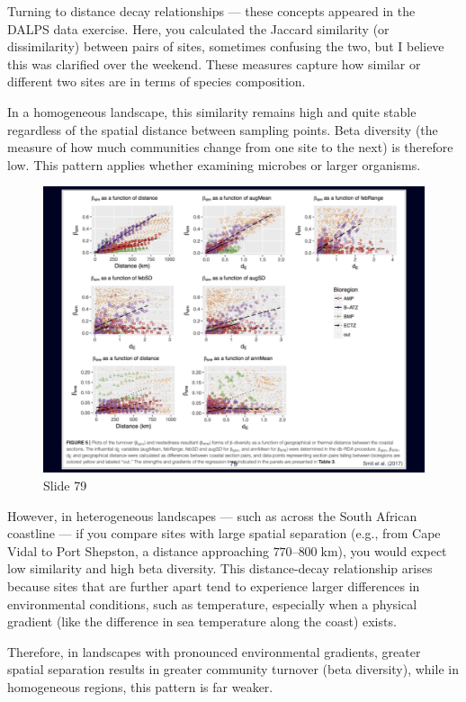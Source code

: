 \documentclass[
  10pt,
]{book}
\begin{document}
Turning to distance decay relationships --- these concepts appeared in
the DALPS data exercise. Here, you calculated the Jaccard similarity (or
dissimilarity) between pairs of sites, sometimes confusing the two, but
I believe this was clarified over the weekend. These measures capture
how similar or different two sites are in terms of species composition.

In a homogeneous landscape, this similarity remains high and quite
stable regardless of the spatial distance between sampling points. Beta
diversity (the measure of how much communities change from one site to
the next) is therefore low. This pattern applies whether examining
microbes or larger organisms.

\begin{figure}[ht]
\centering
\includegraphics[width=0.8\linewidth]{../images/BDC334/BDC334-079.jpeg}
\caption*{Slide 79}
\end{figure}

However, in heterogeneous landscapes --- such as across the South
African coastline --- if you compare sites with large spatial separation
(e.g., from Cape Vidal to Port Shepston, a distance approaching
\(770\)--\(800\;\mathrm{km}\)), you would expect low similarity and high
beta diversity. This distance-decay relationship arises because sites
that are further apart tend to experience larger differences in
environmental conditions, such as temperature, especially when a
physical gradient (like the difference in sea temperature along the
coast) exists.

Therefore, in landscapes with pronounced environmental gradients,
greater spatial separation results in greater community turnover (beta
diversity), while in homogeneous regions, this pattern is far weaker.
\end{document}
